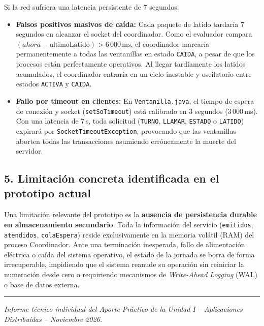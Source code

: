 \documentclass[10pt,a4paper]{article}
\begin{document}
Si la red sufriera una latencia persistente de 7 segundos:
\begin{itemize}
    \item \textbf{Falsos positivos masivos de caída:} Cada paquete de latido tardaría 7 segundos en alcanzar el socket del coordinador. Como el evaluador compara $(ahora - \text{ultimoLatido}) > 6\,000\,\text{ms}$, el coordinador marcaría permanentemente a todas las ventanillas en estado \texttt{CAIDA}, a pesar de que los procesos están perfectamente operativos. Al llegar tardíamente los latidos acumulados, el coordinador entraría en un ciclo inestable y oscilatorio entre estados \texttt{ACTIVA} y \texttt{CAIDA}.
    \item \textbf{Fallo por timeout en clientes:} En \texttt{Ventanilla.java}, el tiempo de espera de conexión y socket (\texttt{setSoTimeout}) está calibrado en 3 segundos (3\,000\,ms). Con una latencia de 7\,s, toda solicitud (\texttt{TURNO}, \texttt{LLAMAR}, \texttt{ESTADO} o \texttt{LATIDO}) expirará por \texttt{SocketTimeoutException}, provocando que las ventanillas aborten todas las transacciones asumiendo erróneamente la muerte del servidor.
\end{itemize}

\subsection*{5. Limitación concreta identificada en el prototipo actual}
Una limitación relevante del prototipo es la \textbf{ausencia de persistencia durable en almacenamiento secundario}. Toda la información del servicio (\texttt{emitidos}, \texttt{atendidos}, \texttt{colaEspera}) reside exclusivamente en la memoria volátil (RAM) del proceso Coordinador. Ante una terminación inesperada, fallo de alimentación eléctrica o caída del sistema operativo, el estado de la jornada se borra de forma irrecuperable, impidiendo que el sistema reanude su operación sin reiniciar la numeración desde cero o requiriendo mecanismos de \textit{Write-Ahead Logging} (WAL) o base de datos externa.

\vspace{0.4cm}
\hrule
\vspace{0.2cm}
\begin{center}
    \footnotesize \textit{Informe técnico individual del Aporte Práctico de la Unidad I -- Aplicaciones Distribuidas -- Noviembre 2026.}
\end{center}
\end{document}
